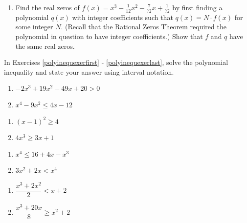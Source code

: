 \begin{enumerate}
\setcounter{enumi}{\value{HW}}

\item Find the real zeros of $f(x) = x^{3} - \frac{1}{12}x^{2} - \frac{7}{72}x + \frac{1}{72}$ by first finding a polynomial $q(x)$ with integer coefficients such that $q(x) = N \cdot f(x)$ for some integer $N$.  (Recall that the Rational Zeros Theorem required the polynomial in question to have integer coefficients.) Show that $f$ and $q$ have the same real zeros.

\setcounter{HW}{\value{enumi}}
\end{enumerate}

In Exercises \ref{polyinequexerfirst} - \ref{polyinequexerlast}, solve the polynomial inequality and state your answer using interval notation.

\begin{multicols}{2}
\begin{enumerate}
\setcounter{enumi}{\value{HW}}

\item $-2x^{3} + 19x^{2} - 49x + 20 > 0$ \label{polyinequexerfirst}
\item $x^{4} - 9x^{2} \leq 4x - 12$

\setcounter{HW}{\value{enumi}}
\end{enumerate}
\end{multicols}

\begin{multicols}{2}
\begin{enumerate}
\setcounter{enumi}{\value{HW}}

\item $(x - 1)^{2} \geq 4$
\item $4x^3 \geq 3x+1$

\setcounter{HW}{\value{enumi}}
\end{enumerate}
\end{multicols}

\begin{multicols}{2}
\begin{enumerate}
\setcounter{enumi}{\value{HW}}

\item $x^4 \leq 16+4x-x^3$
\item $3x^2 + 2x < x^4$

\setcounter{HW}{\value{enumi}}
\end{enumerate}
\end{multicols}

\begin{multicols}{2}
\begin{enumerate}
\setcounter{enumi}{\value{HW}}

\item $\dfrac{x^3+2 x^2}{2} < x+2$
\item $\dfrac{x^3+20x}{8} \geq x^2 + 2$

\setcounter{HW}{\value{enumi}}
\end{enumerate}
\end{multicols}

